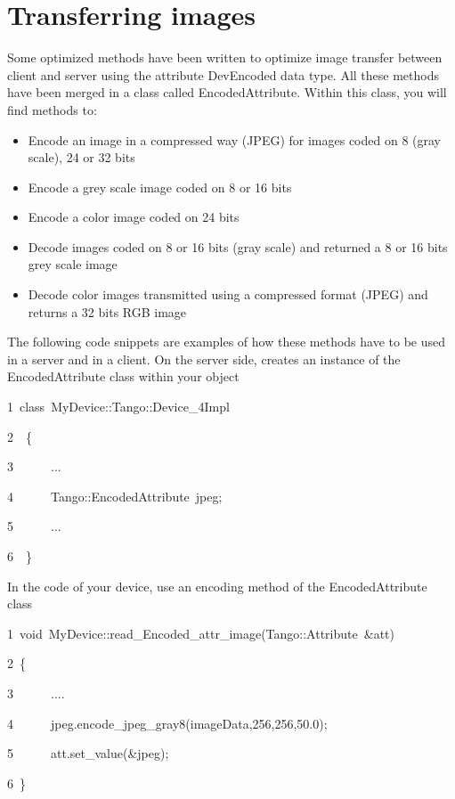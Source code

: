 \section{Transferring images}

Some optimized methods have been written to optimize image transfer
between client and server using the attribute DevEncoded
data type. All these methods have been merged in a class called EncodedAttribute.
Within this class, you will find methods to:
\begin{itemize}
\item Encode an image in a compressed way (JPEG) for images
coded on 8 (gray scale), 24 or 32 bits
\item Encode a grey scale image coded on 8 or 16 bits
\item Encode a color image coded on 24 bits
\item Decode images coded on 8 or 16 bits (gray scale) and returned a 8
or 16 bits grey scale image
\item Decode color images transmitted using a compressed format (JPEG) and
returns a 32 bits RGB image
\end{itemize}
The following code snippets are examples of how these methods have
to be used in a server and in a client. On the server side, creates
an instance of the EncodedAttribute class
within your object


\begin{lyxcode}
1~class~MyDevice::Tango::Device\_4Impl

2~~\{

3~~~~~~...

4~~~~~~Tango::EncodedAttribute~jpeg;

5~~~~~~...

6~~\}
\end{lyxcode}


In the code of your device, use an encoding method of the EncodedAttribute
class


\begin{lyxcode}
1~void~MyDevice::read\_Encoded\_attr\_image(Tango::Attribute~\&att)

2~\{

3~~~~~~....

4~~~~~~jpeg.encode\_jpeg\_gray8(imageData,256,256,50.0);

5~~~~~~att.set\_value(\&jpeg);

6~\}
\end{lyxcode}


